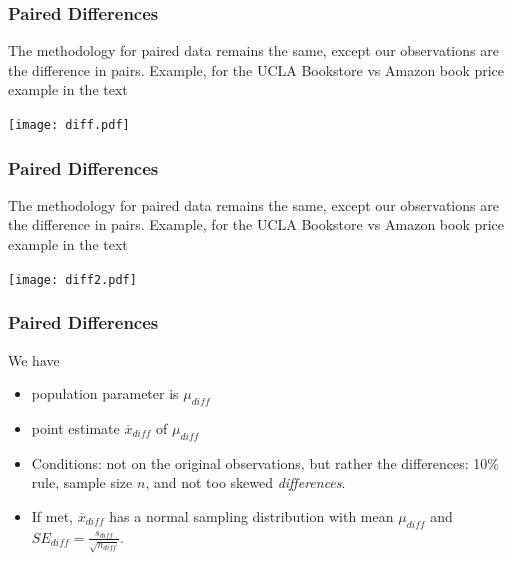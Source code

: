 \documentclass[slides]{beamer}
\newcommand{\blue}[1]{\textcolor{blue2}{#1}}
\newcommand{\xbar}{\overline{x}}
\begin{document}
%
%
\begin{frame}[fragile]
\frametitle{Paired Differences}
The methodology for paired data remains the same, except our \blue{observations} are the difference in pairs.  Example, for the UCLA Bookstore vs Amazon book price example in the text
\begin{center}
\texttt{[image: diff.pdf]}
\end{center}


\end{frame}



\begin{frame}[fragile]
\frametitle{Paired Differences}
The methodology for paired data remains the same, except our \blue{observations} are the difference in pairs.  Example, for the UCLA Bookstore vs Amazon book price example in the text
\begin{center}
\texttt{[image: diff2.pdf]}
\end{center}


\end{frame}



\begin{frame}[fragile]
\frametitle{Paired Differences}
We have
\begin{itemize}
\pause \item population parameter is $\mu_{diff}$
\pause \item point estimate $\xbar_{diff}$ of $\mu_{diff}$
\pause \item Conditions: not on the original observations, but rather the \blue{differences}:  10\% rule, sample size $n$, and not too skewed \textit{differences}.
\pause \item If met,  $\xbar_{diff}$ has a normal sampling distribution with mean $\mu_{diff}$ and $SE_{diff} = \frac{s_{diff}}{\sqrt{n_{diff}}}$.  
\end{itemize}


\end{frame}
\end{document}
